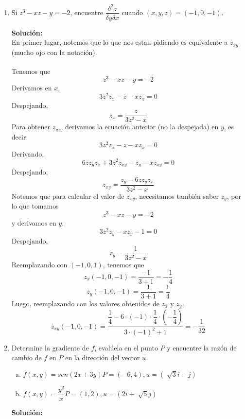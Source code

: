 \documentclass[12pt]{article}
\newenvironment{solucion}
{\begin{mdframed}[backgroundcolor=black!10]
		{\bf Solución:}\\
	}
	{
	\end{mdframed}
}
\newenvironment{preguntas}
{\begin{enumerate}\itemsep12pt
	}
	{
	\end{enumerate}
}
\begin{document}
\begin{preguntas}
\item Si $z^3 - xz - y = -2$, encuentre $\dfrac{\delta^2z}{\delta y \delta x}$ cuando $(x,y,z) = (-1, 0, -1)$.
\begin{solucion}
En primer lugar, notemos que lo que nos estan pidiendo es equivalente a $z_{xy}$ (mucho ojo con la notación).\\
\\
Tenemos que
$$z^3 -xz -y = -2$$
Derivamos en $x$,
$$3z^2z_x - z - xz_x = 0$$
Despejando,
$$z_x = \dfrac{z}{3z^2 - x}$$
Para obtener $z_{yx}$, derivamos la ecuación anterior (no la despejada) en $y$, es decir
$$3z^2z_x - z - xz_x = 0$$
Derivando,
$$6zz_yz_x + 3z^2z_{xy} - z_y - xz_{xy} = 0$$
Despejando,
$$z_{xy} = \dfrac{z_y - 6zz_yz_x}{3z^2 -x}$$
Notemos que para calcular el valor de $z_{xy}$, necesitamos también saber $z_y$, por lo que tomamos
$$z^3 -xz -y = -2$$
y derivamos en $y$,
$$3z^2z_y - xz_y - 1 = 0$$
Despejando,
$$z_y = \dfrac{1}{3z^2 - x}$$
Reemplazando con $(-1,0,1)$, tenemos que
$$z_x(-1,0,-1) = \dfrac{-1}{3+1} = -\dfrac{1}{4}$$
$$z_y(-1,0,-1) = \dfrac{1}{3+1} = \dfrac{1}{4}$$
Luego, reemplazando con los valores obtenidos de $z_x$ y $z_y$,
$$z_{xy}(-1,0,-1) = \dfrac{\dfrac{1}{4} - 6 \cdot (-1)\cdot \dfrac{1}{4} \cdot \left(-\dfrac{1}{4}\right)}{3\cdot (-1)^2 + 1} = -\dfrac{1}{32}$$


\end{solucion}
\item Determine la gradiente de $f$, evalúela en el punto $P$ y encuentre la razón de cambio de $f$ en $P$ en la dirección del vector $u$.
\begin{enumerate}[a)]
\item $f(x,y) = sen(2x+3y)$\tab$P=(-6,4), u=\left(\sqrt[]{3}i - j\right)$
\item $f(x,y) = \dfrac{y^2}{x}$\tab$P=(1,2), u=\left(2i + \sqrt[]{5}j\right)$
\end{enumerate}
\begin{solucion}


\end{solucion}
\end{preguntas}
\end{document}
